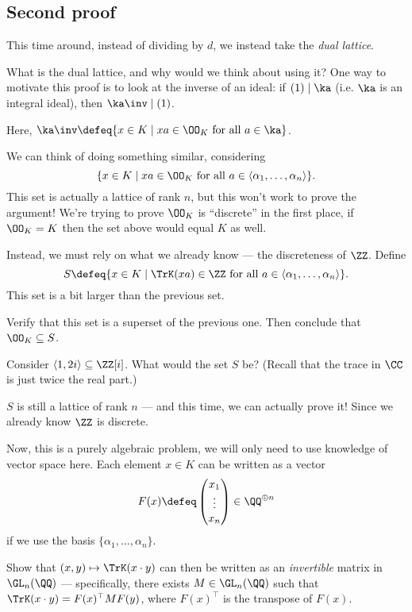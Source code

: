 \subsection{Second proof}

This time around, instead of dividing by $d$, we instead take the \emph{dual lattice}.

What is the dual lattice, and why would we think about using it?
One way to motivate this proof is to look at the inverse of an ideal:
if $(1) \mid \ka$ (i.e. $\ka$ is an integral ideal), then $\ka\inv \mid (1)$.

Here, $\ka\inv \defeq \{ x \in K \mid x a \in \OO_K \text{ for all }a \in \ka\}$.

We can think of doing something similar, considering
\[
	\{ x \in K \mid x a \in \OO_K \text{ for all }a \in \langle \alpha_1, \dots, \alpha_n\rangle \}.
\]
This set is actually a lattice of rank $n$, but this won't work to prove the argument!
We're trying to prove $\OO_K$ is ``discrete'' in the first place, if $\OO_K = K$ then the set above
would equal $K$ as well.

Instead, we must rely on what we already know --- the discreteness of $\ZZ$.
Define
\[
	S \defeq \{ x \in K \mid \TrK(x a) \in \ZZ \text{ for all }a \in
	\langle \alpha_1, \dots, \alpha_n\rangle \}.
\]
This set is a bit larger than the previous set.
\begin{ques}
	Verify that this set is a superset of the previous one. Then conclude that $\OO_K \subseteq S$.
\end{ques}
\begin{exercise}
	Consider $\langle 1, 2i \rangle \subseteq \ZZ[i]$. What would the set $S$ be? (Recall that the
	trace in $\CC$ is just twice the real part.)
\end{exercise}

$S$ is still a lattice of rank $n$ --- and this time, we can actually prove it! Since we already
know $\ZZ$ is discrete.

Now, this is a purely algebraic problem,
we will only need to use knowledge of vector space here.
Each element $x \in K$ can be written as a vector
\[ F(x) \defeq \begin{pmatrix} x_1 \\ \vdots \\ x_n \end{pmatrix} \in \QQ^{\oplus n} \]
if we use the basis $\{ \alpha_1, \dots, \alpha_n \}$.

\begin{exercise}
	Show that $(x, y) \mapsto \TrK(x \cdot y)$ can then be written as an \emph{invertible} matrix in
	$\GL_n(\QQ)$ ---
	specifically, there exists $M \in \GL_n(\QQ)$ such that $\TrK(x \cdot y) = F(x)^\top M F(y)$,
	where $F(x)^\top$ is the transpose of $F(x)$.
\end{exercise}


